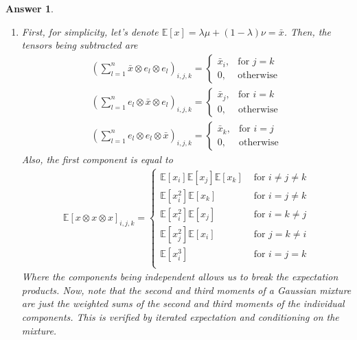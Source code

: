 \documentclass[12pt]{article}
\theoremstyle{colon}
\newtheorem*{answer}{Answer}
\begin{document}
\begin{answer}
  \leavevmode
  \begin{enumerate}[label=\arabic*)]
    \item First, for simplicity, let's denote $\mathbb{E}[x] = \lambda \mu + (1-\lambda) \nu = \bar{x}$. Then, the tensors being subtracted are
      \begin{gather*}
        (\sum_{l=1}^n \bar{x} \otimes e_l \otimes e_l)_{i,j,k} = \begin{cases}
          \bar{x}_i, & \text{for } j = k \\
          0, & \text{otherwise}
        \end{cases} \\
        (\sum_{l=1}^n e_l \otimes \bar{x} \otimes e_l)_{i,j,k} = \begin{cases}
          \bar{x}_j, & \text{for } i = k \\
          0, & \text{otherwise}
        \end{cases} \\
        (\sum_{l=1}^n e_l \otimes e_l \otimes \bar{x})_{i,j,k} = \begin{cases}
          \bar{x}_k, & \text{for } i = j \\
          0, & \text{otherwise}
        \end{cases}
      \end{gather*}
      Also, the first component is equal to
      \begin{gather*}
        \mathbb{E}[ x \otimes x \otimes x ]_{i,j,k} = \begin{cases}
          \mathbb{E}[x_i]\mathbb{E}[x_j]\mathbb{E}[x_k] & \text{ for } i \neq j \neq k \\
          \mathbb{E}[x_i^2]\mathbb{E}[x_k] & \text{ for } i = j \neq k \\
          \mathbb{E}[x_i^2]\mathbb{E}[x_j] & \text{ for } i = k \neq j \\
          \mathbb{E}[x_j^2]\mathbb{E}[x_i] & \text{ for } j = k \neq i \\
          \mathbb{E}[x_i^3] & \text{ for } i = j = k \\
        \end{cases}
      \end{gather*}
      Where the components being independent allows us to break the expectation products. Now, note that the second and third moments of a Gaussian mixture are just the weighted sums of the second and third moments of the individual components. This is verified by iterated expectation and conditioning on the mixture.

\end{enumerate}
\end{answer}
\end{document}
